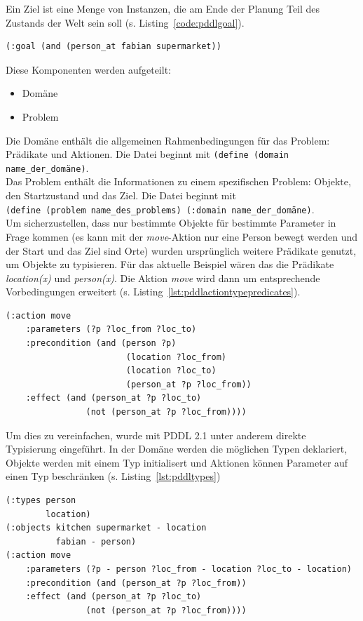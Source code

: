 Ein Ziel ist eine Menge von Instanzen, die am Ende der Planung Teil des Zustands der Welt sein soll (s. Listing~\ref{code:pddlgoal}).
\begin{lstlisting}[caption={Ziel in \acs{PDDL}},language=pddl,label=code:pddlgoal]
(:goal (and (person_at fabian supermarket))
\end{lstlisting}
Diese Komponenten werden aufgeteilt:
\begin{itemize}
    \item Domäne
    \item Problem
\end{itemize}
Die Domäne enthält die allgemeinen Rahmenbedingungen für das Problem: Prädikate und Aktionen.
Die Datei beginnt mit \verb|(define (domain name_der_domäne)|.\\
Das Problem enthält die Informationen zu einem spezifischen Problem: Objekte, den Startzustand und das Ziel.
Die Datei beginnt mit\\\verb|(define (problem name_des_problems) (:domain name_der_domäne)|.\\
Um sicherzustellen, dass nur bestimmte Objekte für bestimmte Parameter in Frage kommen (es kann mit der \emph{move}-Aktion nur eine Person bewegt werden und der Start und das Ziel sind Orte) wurden ursprünglich weitere Prädikate genutzt, um Objekte zu typisieren.
Für das aktuelle Beispiel wären das die Prädikate \emph{location(x)} und \emph{person(x)}.
Die Aktion \emph{move} wird dann um entsprechende Vorbedingungen erweitert (s. Listing~\ref{lst:pddlactiontypepredicates}).
\begin{lstlisting}[caption={Move Aktion mit Prädikaten zur Typisierung},language=pddl,label={lst:pddlactiontypepredicates}]
(:action move
    :parameters (?p ?loc_from ?loc_to)
    :precondition (and (person ?p)
                        (location ?loc_from)
                        (location ?loc_to)
                        (person_at ?p ?loc_from))
    :effect (and (person_at ?p ?loc_to)
                (not (person_at ?p ?loc_from))))
\end{lstlisting}
Um dies zu vereinfachen, wurde mit \acs{PDDL} 2.1 unter anderem direkte Typisierung eingeführt.
In der Domäne werden die möglichen Typen deklariert, Objekte werden mit einem Typ initialisert und Aktionen können Parameter auf einen Typ beschränken (s. Listing~\ref{lst:pddltypes})
\begin{lstlisting}[caption={Typ Unterstützung in \acs{PDDL} 2.1},language=pddl,label={lst:pddltypes}]
(:types person
        location)
(:objects kitchen supermarket - location
          fabian - person)
(:action move
    :parameters (?p - person ?loc_from - location ?loc_to - location)
    :precondition (and (person_at ?p ?loc_from))
    :effect (and (person_at ?p ?loc_to)
                (not (person_at ?p ?loc_from))))
\end{lstlisting}
